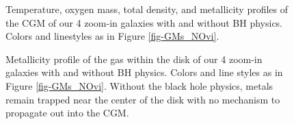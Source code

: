 \documentclass[]{emulateapj}
\begin{document}
\begin{figure}
{}
\caption[]{Temperature, oxygen mass, total density, and metallicity profiles of the CGM of our 4 zoom-in galaxies with and without BH physics. Colors and linestyles as in Figure \ref{fig-GMs_NOvi}.}
\label{fig-GMs_profiles}
\end{figure}

\begin{figure}[h!]
\centerline{}
\caption[]{Metallicity profile of the gas within the disk of our 4 zoom-in galaxies with and without BH physics. Colors and line styles as in Figure \ref{fig-GMs_NOvi}. Without the black hole physics, metals remain trapped near the center of the disk with no mechanism to propagate out into the CGM.}
\label{fig-disk_Z}
\end{figure}
\end{document}
